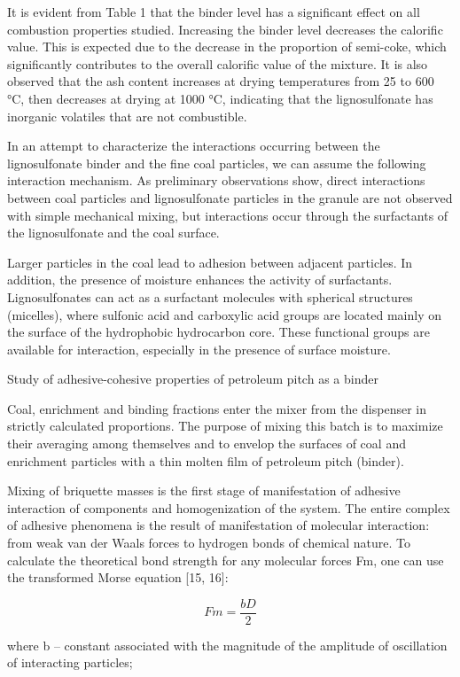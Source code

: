 \begin{multicols}{2}
It is evident from Table 1 that the binder level has a significant
effect on all combustion properties studied. Increasing the binder level
decreases the calorific value. This is expected due to the decrease in
the proportion of semi-coke, which significantly contributes to the
overall calorific value of the mixture. It is also observed that the ash
content increases at drying temperatures from 25 to 600 °C, then
decreases at drying at 1000 °C, indicating that the lignosulfonate has
inorganic volatiles that are not combustible.

In an attempt to characterize the interactions occurring between the
lignosulfonate binder and the fine coal particles, we can assume the
following interaction mechanism. As preliminary observations show,
direct interactions between coal particles and lignosulfonate particles
in the granule are not observed with simple mechanical mixing, but
interactions occur through the surfactants of the lignosulfonate and the
coal surface.

Larger particles in the coal lead to adhesion between adjacent
particles. In addition, the presence of moisture enhances the activity
of surfactants. Lignosulfonates can act as a surfactant molecules with
spherical structures (micelles), where sulfonic acid and carboxylic acid
groups are located mainly on the surface of the hydrophobic hydrocarbon
core. These functional groups are available for interaction, especially
in the presence of surface moisture.

Study of adhesive-cohesive properties of petroleum pitch as a binder

Coal, enrichment and binding fractions enter the mixer from the
dispenser in strictly calculated proportions. The purpose of mixing this
batch is to maximize their averaging among themselves and to envelop the
surfaces of coal and enrichment particles with a thin molten film of
petroleum pitch (binder).

Mixing of briquette masses is the first stage of manifestation of
adhesive interaction of components and homogenization of the system. The
entire complex of adhesive phenomena is the result of manifestation of
molecular interaction: from weak van der Waals forces to hydrogen bonds
of chemical nature. To calculate the theoretical bond strength for any
molecular forces Fm, one can use the transformed Morse equation {[}15,
16{]}:

\[Fm = \frac{bD}{2}\]

where b -- constant associated with the magnitude of the amplitude of
oscillation of interacting particles;


\end{multicols}
